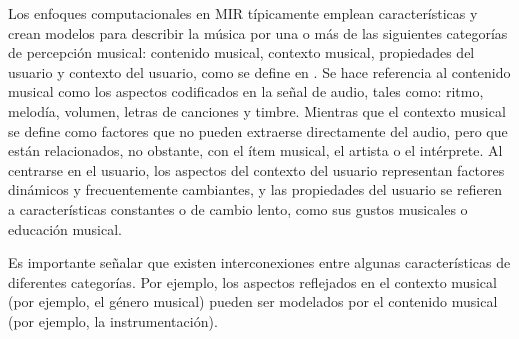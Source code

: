 Los enfoques computacionales en MIR típicamente emplean características y crean modelos para describir la música por una o más de las siguientes categorías de percepción musical: contenido musical, contexto musical, propiedades del usuario y contexto del usuario, como se define en \cite{Schedl2014MusicIR}. Se hace referencia al contenido musical como los aspectos codificados en la señal de audio, tales como: ritmo, melodía, volumen, letras de canciones y timbre. Mientras que el contexto musical se define como factores que no pueden extraerse directamente del audio, pero que están relacionados, no obstante, con el ítem musical, el artista o el intérprete. Al centrarse en el usuario, los aspectos del contexto del usuario representan factores dinámicos y frecuentemente cambiantes, y las propiedades del usuario se refieren a características constantes o de cambio lento, como sus gustos musicales o educación musical.

Es importante señalar que existen interconexiones entre algunas características de diferentes categorías. Por ejemplo, los aspectos reflejados en el contexto musical (por ejemplo, el género musical) pueden ser modelados por el contenido musical (por ejemplo, la instrumentación).

